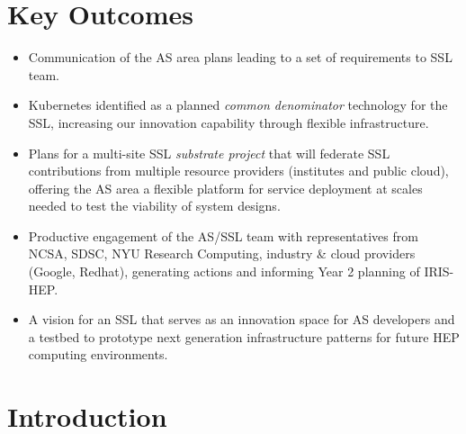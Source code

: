 \documentclass[11pt,letterpaper,fleqn]{article}
\begin{document}
\section*{Key Outcomes}
\vspace{3pt}
\begin{itemize}
  \item Communication of the AS area plans leading to a set of requirements to SSL team.
  \item Kubernetes identified as a planned {\it common denominator} technology for the SSL, increasing our innovation capability through flexible infrastructure.
  \item Plans for a multi-site SSL {\it substrate project} that will federate SSL contributions from multiple resource providers (institutes and public cloud), offering the AS area a flexible platform for service deployment at scales needed to test the viability of system designs.
  \item Productive engagement of the AS/SSL team with representatives from NCSA, SDSC, NYU Research Computing, industry \& cloud providers (Google, Redhat), generating actions and informing Year 2 planning of IRIS-HEP.
  \item A vision for an SSL that serves as an innovation space for AS developers and a testbed to prototype next generation infrastructure patterns for future HEP computing environments.
\end{itemize}


\newpage
\pagestyle{reststyle}

\section{Introduction}
\end{document}
